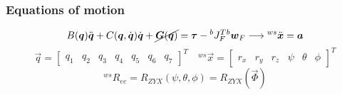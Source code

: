 \begin{frame}[shrink=10]
  \frametitle{Equations of motion}
  \centering
  \begin{block}{}
    \begin{equation*}
      B(\vec{q}) \ddot{\vec{q}} + C(\vec{q}, \dot{\vec{q}}) \dot{\vec{q}} + \cancel{\vec{G}(\vec{q})} = \vec{\tau} - {}^{b}J^{T}_{F} {}^b\vec{w}_{F} 
      \longrightarrow {}^{ws}\ddot{\vec{x}} = \vec{a}
    \end{equation*}
    \begin{equation*}
      \vec{q} = 
      \begin{bmatrix}
        q_1 & q_2 & q_3 & q_4 & q_5 & q_6 & q_7
      \end{bmatrix}^T
      \quad
          {}^{ws}\vec{x} = 
          \begin{bmatrix}
            r_x & r_y & r_z & \psi & \theta & \phi
          \end{bmatrix}^T
    \end{equation*}
    \begin{equation*}
      {}^{ws}R_{ee} = R_{ZYX}(\psi, \theta, \phi) = R_{ZYX}(\vec{\Phi})
    \end{equation*}
  \end{block}
  

\end{frame}
